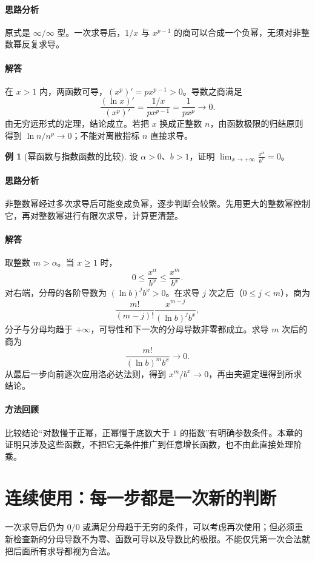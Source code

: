 \documentclass[UTF8,fontset=fandol,12pt,oneside,openany]{ctexrep}
\theoremstyle{definition}
\newtheorem{example}{例}[chapter]
\begin{document}
\paragraph{思路分析}
原式是 $\infty/\infty$ 型。一次求导后，$1/x$ 与 $x^{p-1}$ 的商可以合成一个负幂，无须对非整数幂反复求导。
\paragraph{解答}
在 $x>1$ 内，两函数可导，$(x^p)'=px^{p-1}>0$。导数之商满足
\[
\frac{(\ln x)'}{(x^p)'}
=\frac{1/x}{px^{p-1}}=\frac1{px^p}\to0.
\]
由无穷远形式的定理，结论成立。若把 $x$ 换成正整数 $n$，由函数极限的归结原则得到 $\ln n/n^p\to0$；不能对离散指标 $n$ 直接求导。

\begin{example}[幂函数与指数函数的比较]
设 $\alpha>0$、$b>1$，证明 $\displaystyle\lim_{x\to+\infty}\frac{x^\alpha}{b^x}=0$。
\end{example}
\paragraph{思路分析}
非整数幂经过多次求导后可能变成负幂，逐步判断会较繁。先用更大的整数幂控制它，再对整数幂进行有限次求导，计算更清楚。
\paragraph{解答}
取整数 $m>\alpha$。当 $x\ge1$ 时，
\[
0\le\frac{x^\alpha}{b^x}\le\frac{x^m}{b^x}.
\]
对右端，分母的各阶导数为 $(\ln b)^j b^x>0$。在求导 $j$ 次之后（$0\le j<m$），商为
\[
\frac{m!}{(m-j)!}\frac{x^{m-j}}{(\ln b)^j b^x},
\]
分子与分母均趋于 $+\infty$，可导性和下一次的分母导数非零都成立。求导 $m$ 次后的商为
\[
\frac{m!}{(\ln b)^m b^x}\to0.
\]
从最后一步向前逐次应用洛必达法则，得到 $x^m/b^x\to0$，再由夹逼定理得到所求结论。

\paragraph{方法回顾}
比较结论“对数慢于正幂，正幂慢于底数大于 $1$ 的指数”有明确参数条件。本章的证明只涉及这些函数，不把它无条件推广到任意增长函数，也不由此直接处理阶乘。

\section{连续使用：每一步都是一次新的判断}
\label{lec:07:repeated}

一次求导后仍为 $0/0$ 或满足分母趋于无穷的条件，可以考虑再次使用；但必须重新检查新的分母导数不为零、函数可导以及导数比的极限。不能仅凭第一次合法就把后面所有求导都视为合法。
\end{document}
